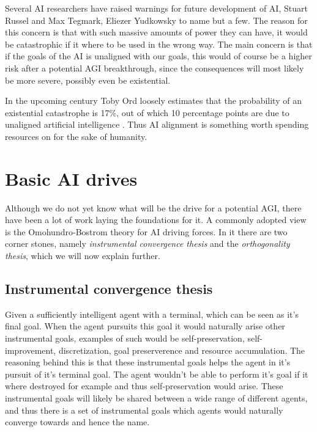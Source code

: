 \documentclass[12pt,A4]{report}
\theoremstyle{definition}
\begin{document}
Several AI researchers have raised warnings for future development of AI, Stuart Russel and Max Tegmark, Eliezer Yudkowsky to name but a few. The reason for this concern is that with such massive amounts of power they can have, it would be catastrophic if it where to be used in the wrong way. The main concern is that if the goals of the AI is unaligned with our goals, this would of course be a higher risk after a potential AGI breakthrough, since the consequences will most likely be more severe, possibly even be existential. 

In the upcoming century Toby Ord loosely estimates that the probability of an existential catastrophe is 17\%, out of which 10 percentage points are due to unaligned artificial intelligence \autocite{[precipice]}. Thus AI alignment is something worth spending resources on for the sake of humanity. 


\section{Basic AI drives}
Although we do not yet know what will be the drive for a potential AGI, there have been a lot of work laying the foundations for it. A commonly adopted view is the Omohundro-Bostrom theory for AI driving forces. In it there are two corner stones, namely \textit{instrumental convergence thesis} and the \textit{orthogonality thesis}, which we will now explain further.

\subsection{Instrumental convergence thesis}
Given a sufficiently intelligent agent with a terminal, which can be seen as it's final goal. When the agent pursuits this goal it would naturally arise other instrumental goals, examples of such would be self-preservation, self-improvement, discretization, goal preserverence and resource accumulation. The reasoning behind this is that these instrumental goals helps the agent in it's pursuit of it's terminal goal. The agent wouldn't be able to perform it's goal if it where destroyed for example and thus self-preservation would arise. These instrumental goals will likely be shared between a wide range of different agents, and thus there is a set of instrumental goals which agents would naturally converge towards and hence the name. 
\end{document}
